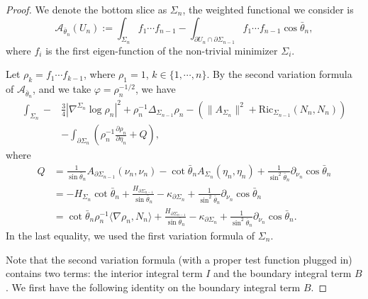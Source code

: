 \documentclass[11pt,letterpaper]{amsart}
\begin{document}
\begin{proof}
    We denote the bottom slice as $\Sigma_n$, the weighted functional we consider is 
    \[
    \mathcal A_{\bar{\theta}_n}(U_n):=\int_{\Sigma_n}f_1\cdots f_{n-1}-\int_{\partial U_n\cap \partial \Sigma_{n-1}}f_1\cdots f_{n-1}\cos\bar{\theta}_n,
    \]
    where $f_i$ is the first eigen-function of the non-trivial minimizer $\Sigma_i$.


     Let $\rho_{k}=f_1\cdots f_{k-1}$, where $\rho_1=1$, $k\in\{1,\cdots,n\}$.
    By the second variation formula of $\mathcal A_{\bar{\theta}_n}$, and we take $\varphi=\rho_n^{-1/2}$, we have
    \begin{align*}
        \int_{\Sigma_n}-&\frac{3}{4}|\nabla^{\Sigma_n}\log \rho_n|^2+\rho_n^{-1}\Delta_{\Sigma_{n-1}}\rho_n-\left(\|A_{\Sigma_n}\|^2+\text{Ric}_{\Sigma_{n-1}}(N_n,N_n)\right)\\
        &-\int_{\partial\Sigma_n}\left(\rho_n^{-1}\frac{\partial \rho_n}{\partial\eta_n}+Q\right),
    \end{align*}
    where 
    \begin{align*}
    Q&=\frac{1}{\sin\bar{\theta}_n}A_{\partial\Sigma_{n-1}}(\nu_n,\nu_n)-\cot\bar{\theta}_nA_{\Sigma_n}(\eta_n,\eta_n)+\frac{1}{\sin^2\bar{\theta}_n}\partial_{\nu_n}\cos\bar{\theta}_n\\
    &=-H_{\Sigma_n}\cot\bar{\theta}_n+\frac{H_{\partial\Sigma_{n-1}}}{\sin\bar{\theta}_n}-\kappa_{\partial\Sigma_n}+\frac{1}{\sin^2\bar{\theta}_n}\partial_{\nu_n}\cos\bar{\theta}_n\\
    &=\cot\bar{\theta}_n\rho_n^{-1}\langle \nabla \rho_n,N_n\rangle+\frac{H_{\partial\Sigma_{n-1}}}{\sin\bar{\theta}_n}-\kappa_{\partial\Sigma_n}+\frac{1}{\sin^2\bar{\theta}_n}\partial_{\nu_n}\cos\bar{\theta}_n.
    \end{align*}
In the last equality, we used the first variation formula of $\Sigma_n$.

Note that the second variation formula (with a proper test function plugged in) contains two terms: the interior integral term $I$ and the boundary integral term $B$. We first have the following identity on the boundary integral term $B$.


\end{proof}
\end{document}
